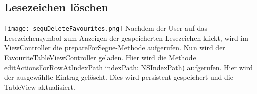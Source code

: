 \subsection{Lesezeichen löschen}
\texttt{[image: sequDeleteFavourites.png]}
Nachdem der User auf das Lesezeichensymbol zum Anzeigen der gespeicherten Lesezeichen klickt, wird im ViewController die prepareForSegue-Methode aufgerufen. Nun wird der FavouriteTableViewController geladen. Hier wird die Methode editActionsForRowAtIndexPath indexPath: NSIndexPath) aufgerufen. Hier wird der ausgewählte Eintrag gelöscht. Dies wird persistent gespeichert und die TableView aktualisiert.
\pagebreak

